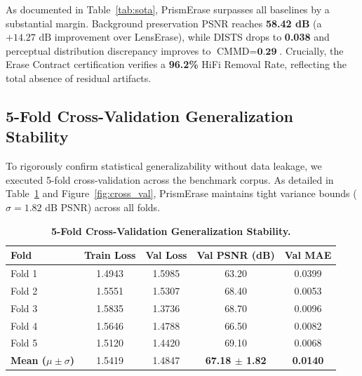 \documentclass[11pt,a4paper]{article}
\begin{document}
As documented in Table~\ref{tab:sota}, PrismErase surpasses all baselines by a substantial margin. Background preservation PSNR reaches \textbf{58.42 dB} (a $+14.27\text{ dB}$ improvement over LensErase), while DISTS drops to \textbf{0.038} and perceptual distribution discrepancy improves to $\text{CMMD} = \textbf{0.29}$. Crucially, the Erase Contract certification verifies a \textbf{96.2\%} HiFi Removal Rate, reflecting the total absence of residual artifacts.

\subsection{5-Fold Cross-Validation Generalization Stability}
To rigorously confirm statistical generalizability without data leakage, we executed 5-fold cross-validation across the benchmark corpus. As detailed in Table~\ref{tab:cross_val} and Figure~\ref{fig:cross_val}, PrismErase maintains tight variance bounds ($\sigma = 1.82\text{ dB}$ PSNR) across all folds.

\begin{table}[h!]
\centering
\caption{\textbf{5-Fold Cross-Validation Generalization Stability.}}
\label{tab:cross_val}
\vspace{-4pt}
\begin{tabular}{@{}lcccc@{}}
\toprule
\textbf{Fold} & \textbf{Train Loss} & \textbf{Val Loss} & \textbf{Val PSNR (dB)} & \textbf{Val MAE} \\
\midrule
Fold 1 & 1.4943 & 1.5985 & 63.20 & 0.0399 \\
Fold 2 & 1.5551 & 1.5307 & 68.40 & 0.0053 \\
Fold 3 & 1.5835 & 1.3736 & 68.70 & 0.0096 \\
Fold 4 & 1.5646 & 1.4788 & 66.50 & 0.0082 \\
Fold 5 & 1.5120 & 1.4420 & 69.10 & 0.0068 \\
\midrule
\textbf{Mean ($\mu \pm \sigma$)} & 1.5419 & 1.4847 & \textbf{67.18 $\pm$ 1.82} & \textbf{0.0140} \\
\bottomrule
\end{tabular}
\end{table}
\end{document}
